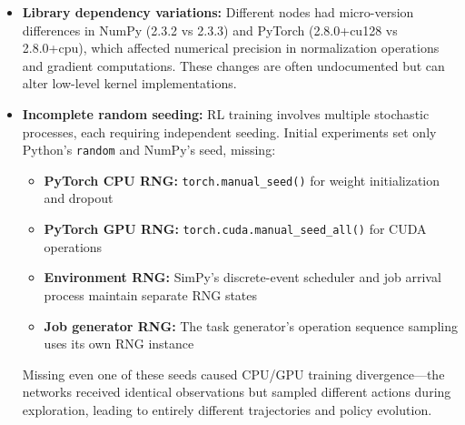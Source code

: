 \begin{itemize}
    \item \textbf{Library dependency variations:} Different nodes had micro-version differences in NumPy (2.3.2 vs 2.3.3) and PyTorch (2.8.0+cu128 vs 2.8.0+cpu), which affected numerical precision in normalization operations and gradient computations. These changes are often undocumented but can alter low-level kernel implementations.
    
    \item \textbf{Incomplete random seeding:} RL training involves multiple stochastic processes, each requiring independent seeding. Initial experiments set only Python's \texttt{random} and NumPy's seed, missing:
    \begin{itemize}
        \item \textbf{PyTorch CPU RNG:} \texttt{torch.manual\_seed()} for weight initialization and dropout
        \item \textbf{PyTorch GPU RNG:} \texttt{torch.cuda.manual\_seed\_all()} for CUDA operations
        \item \textbf{Environment RNG:} SimPy's discrete-event scheduler and job arrival process maintain separate RNG states
        \item \textbf{Job generator RNG:} The task generator's operation sequence sampling uses its own RNG instance
    \end{itemize}
    Missing even one of these seeds caused CPU/GPU training divergence—the networks received identical observations but sampled different actions during exploration, leading to entirely different trajectories and policy evolution.
\end{itemize}


